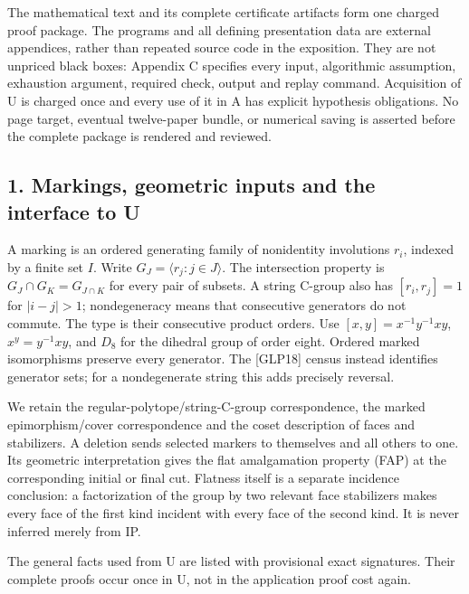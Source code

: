 \documentclass[
  11pt,
  a4paper,
]{article}
\begin{document}
The mathematical text and its complete certificate artifacts form one
charged proof package. The programs and all defining presentation data
are external appendices, rather than repeated source code in the
exposition. They are not unpriced black boxes: Appendix C specifies
every input, algorithmic assumption, exhaustion argument, required
check, output and replay command. Acquisition of U is charged once and
every use of it in A has explicit hypothesis obligations. No page
target, eventual twelve-paper bundle, or numerical saving is asserted
before the complete package is rendered and reviewed.

\subsection{1. Markings, geometric inputs and the interface to
U}\label{markings-geometric-inputs-and-the-interface-to-u}

A marking is an ordered generating family of nonidentity involutions
\(r_i\), indexed by a finite set \(I\). Write
\(G_J=\langle r_j:j\in J\rangle\). The intersection property is
\(G_J\cap G_K=G_{J\cap K}\) for every pair of subsets. A string C-group
also has \([r_i,r_j]=1\) for \(|i-j|>1\); nondegeneracy means that
consecutive generators do not commute. The type is their consecutive
product orders. Use \([x,y]=x^{-1}y^{-1}xy\), \(x^y=y^{-1}xy\), and
\(D_8\) for the dihedral group of order eight. Ordered marked
isomorphisms preserve every generator. The {[}GLP18{]} census instead
identifies generator sets; for a nondegenerate string this adds
precisely reversal.

We retain the regular-polytope/string-C-group correspondence, the marked
epimorphism/cover correspondence and the coset description of faces and
stabilizers. A deletion sends selected markers to themselves and all
others to one. Its geometric interpretation gives the flat amalgamation
property (FAP) at the corresponding initial or final cut. Flatness
itself is a separate incidence conclusion: a factorization of the group
by two relevant face stabilizers makes every face of the first kind
incident with every face of the second kind. It is never inferred merely
from IP.

The general facts used from U are listed with provisional exact
signatures. Their complete proofs occur once in U, not in the
application proof cost again.
\end{document}
